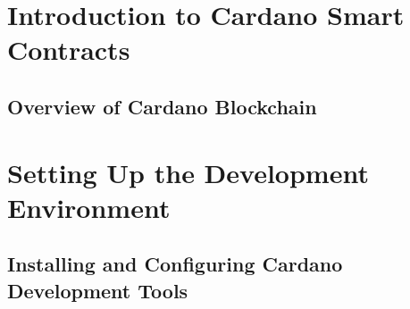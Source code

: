\usepackage{lipsum}
\usepackage[automake,toc]{glossaries}
\usepackage{caption}
\usepackage{listings}
\usepackage{xcolor}
\usepackage{filecontents}
\makeglossaries




\coverpage{\TITLE}{\SUBTITLE}{\AUTHOR}{\DATE}{\SUBJECT}
\newpage
\tableofcontents

\part{Introduction to Cardano Smart Contracts}
\newpage
\chapter{Overview of Cardano Blockchain} \label{ch:overview}

\part{Setting Up the Development Environment}
\newpage
\chapter{Installing and Configuring Cardano Development Tools} \label{ch:setup}


